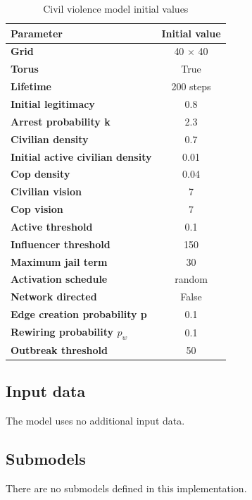 \documentclass[10pt]{article}
\begin{document}
    \begin{table}[h]
        \centering
        \begin{tabular}{||>{\bfseries}l c ||}
            \hline
            Parameter & Initial value \\
            \hline
            \hline
            Grid & 40 $\times$ 40 \\
            Torus & True \\
            Lifetime & 200 steps \\
            Initial legitimacy & 0.8 \\
            Arrest probability k & 2.3 \\
            Civilian density & 0.7 \\
            Initial active civilian density & 0.01 \\
            Cop density & 0.04 \\
            Civilian vision & 7 \\
            Cop vision & 7 \\
            Active threshold & 0.1 \\
            Influencer threshold & 150 \\
            Maximum jail term & 30 \\
            Activation schedule & random \\
            Network directed & False \\
            Edge creation probability p & 0.1 \\
            Rewiring probability $p_w$ & 0.1 \\
            Outbreak threshold & 50 \\
            \hline
        \end{tabular}
        \caption{Civil violence model initial values }
        \label{table:parameter_initialization}
    \end{table}

    \subsection{Input data}
    The model uses no additional input data.

    \subsection{Submodels}
    There are no submodels defined in this implementation.

    \newpage
\end{document}

